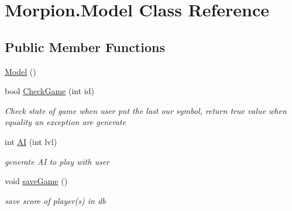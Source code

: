 \hypertarget{class_morpion_1_1_model}{}\section{Morpion.\+Model Class Reference}
\label{class_morpion_1_1_model}


 


\subsection*{Public Member Functions}
\begin{DoxyCompactItemize}
\item 
\hyperlink{class_morpion_1_1_model_a459b4901421170316a320d2e7d6408b4}{Model} ()
\item 
bool \hyperlink{class_morpion_1_1_model_a76f2eb1ec20a4aa78cca17514a0b94e1}{Check\+Game} (int id)
\begin{DoxyCompactList}\small\item\em Check state of game when user put the last our symbol, return true value when equality an exception are generate \end{DoxyCompactList}\item 
int \hyperlink{class_morpion_1_1_model_a02dd1ba77ebd6563c86164592b339ed0}{AI} (int lvl)
\begin{DoxyCompactList}\small\item\em generate AI to play with user \end{DoxyCompactList}\item 
void \hyperlink{class_morpion_1_1_model_a63707654f2d7d2912d854e5b1f9ced7e}{save\+Game} ()
\begin{DoxyCompactList}\small\item\em save score of player(s) in db \end{DoxyCompactList}\end{DoxyCompactItemize}
